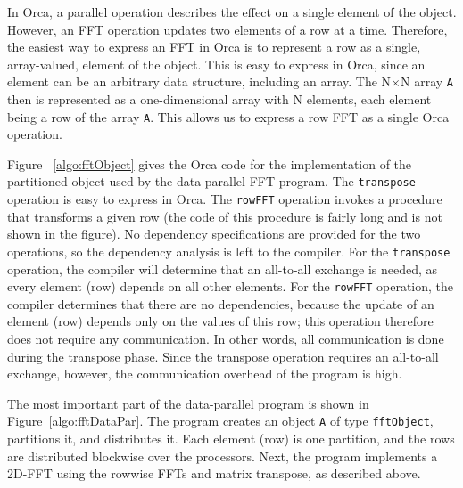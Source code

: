 \documentclass{acmtrans2e}
\begin{document}
In Orca, a parallel operation describes the effect on a single element of
the object.
However, an FFT operation updates two elements of a row at a time.
Therefore, the easiest way to express an FFT in Orca is to represent a row
as a single, array-valued, element of the object.
This is easy to express in Orca, since an element can be an arbitrary data
structure, including an array.
The N$\times$N array \verb+A+ then is represented as a one-dimensional array
with N elements, each element being a row of the array \verb+A+.
This allows us to express a row FFT as a single Orca operation.

Figure ~\ref{algo:fftObject} gives the Orca code for the implementation of
the partitioned object used by the data-parallel FFT program.
The \verb+transpose+ operation is easy to express in Orca.
The \verb+rowFFT+ operation invokes a procedure that transforms
a given row (the code of this procedure is fairly long and is
not shown in the figure).
No dependency specifications are provided for the two operations, so the
dependency analysis is left to the compiler.
For the \verb+transpose+ operation, the compiler will determine that an
all-to-all exchange is needed, as every element (row) depends on
all other elements.
For the \verb+rowFFT+ operation, the compiler determines that there are
no dependencies, because the update of an element (row) depends only
on the values of this row; this operation therefore does not require any
communication.
In other words, all communication is done during the transpose phase.
Since the transpose operation requires an all-to-all exchange, however,
the communication overhead of the program is high.

The most important part of the data-parallel program is shown
in Figure~\ref{algo:fftDataPar}.
The program creates an object \verb+A+ of type \verb+fftObject+,
partitions it, and distributes it.
Each element (row) is one partition, and the rows are distributed blockwise
over the processors.
Next, the program implements a 2D-FFT using the rowwise
FFTs and matrix transpose, as described above.
\end{document}
